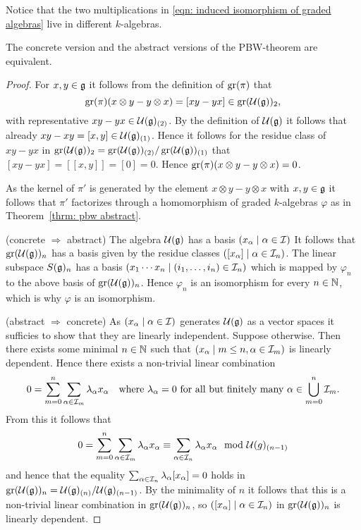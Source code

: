 \begin{rem}
 Notice that the two multiplications in \eqref{eqn: induced isomorphism of graded algebras} live in different $k$-algebras.
\end{rem}


\begin{prop}
 The concrete version and the abstract versions of the PBW-theorem are equivalent.
\end{prop}
\begin{proof}
 For $x, y \in \mathfrak{g}$ it follows from the definition of $\operatorname{gr}(\pi)$ that
 \[
  \operatorname{gr}(\pi)(x \otimes y - y \otimes x) = [xy-yx] \in \operatorname{gr}(\mathcal{U}(\mathfrak{g}))_2,
 \]
 with representative $xy-yx \in \mathcal{U}(\mathfrak{g})_{(2)}$. By the definition of $\mathcal{U}(\mathfrak{g})$ it follows that already \mbox{$xy-xy = [x,y] \in \mathcal{U}(\mathfrak{g})_{(1)}$}. Hence it follows for the residue class of $xy-yx$ in $\operatorname{gr}(\mathcal{U}(\mathfrak{g}))_2 = \operatorname{gr}(\mathcal{U}(\mathfrak{g}))_{(2)}/\operatorname{gr}(\mathcal{U}(\mathfrak{g}))_{(1)}$ that $[xy-yx] = [[x,y]] = [0] = 0$. Hence $\operatorname{gr}(\pi)(x \otimes y - y \otimes x) = 0$.
 
 As the kernel of $\pi'$ is generated by the element $x \otimes y - y \otimes x$ with $x,y \in \mathfrak{g}$ it follows that $\pi'$ factorizes through a homomorphism of graded $k$-algebras $\varphi$ as in Theorem~\ref{thrm: pbw abstract}.
 
 (concrete $\Rightarrow$ abstract) The algebra $\mathcal{U}(\mathfrak{g})$ has a basis $(x_\alpha \mid \alpha \in \mathcal{I})$ It follows that $\operatorname{gr}(\mathcal{U}(\mathfrak{g}))_n$ has a basis given by the residue classes $([x_\alpha] \mid \alpha \in \mathcal{I}_n)$. The linear subspace $S(\mathfrak{g})_n$ has a basis $(x_1 \dotsm x_n \mid (i_1, \dotsc, i_n) \in \mathcal{I}_n)$ which is mapped by $\varphi_n$ to the above basis of $\operatorname{gr}(\mathcal{U}(\mathfrak{g}))_n$. Hence $\varphi_n$ is an isomorphism for every $n \in \mathbb{N}$, which is why $\varphi$ is an isomorphism.
 
 (abstract $\Rightarrow$ concrete) As $(x_\alpha \mid \alpha \in \mathcal{I})$ generates $\mathcal{U}(\mathfrak{g})$ as a vector spaces it sufficies to show that they are linearly independent. Suppose otherwise. Then there exists some minimal $n \in \mathbb{N}$ such that $(x_\alpha \mid m \leq n, \alpha \in \mathcal{I}_m)$ is linearly dependent. Hence there exists a non-trivial linear combination
 \[
  0 = \sum_{m=0}^n \sum_{\alpha \in \mathcal{I}_m} \lambda_\alpha x_\alpha
 \quad
 \text{where $\lambda_\alpha = 0$ for all but finitely many $\alpha \in \bigcup_{m=0}^n \mathcal{I}_m$}.
 \]
 From this it follows that
 \[
  0
  = \sum_{m=0}^n \sum_{\alpha \in \mathcal{I}_m} \lambda_\alpha x_\alpha
  \equiv \sum_{\alpha \in \mathcal{I}_n} \lambda_\alpha x_\alpha
  \mod {\mathcal{U}}(g)_{(n-1)}
 \]
 and hence that the equality $\sum_{\alpha \in \mathcal{I}_n} \lambda_\alpha [x_\alpha] = 0$ holds in $\operatorname{gr}(\mathcal{U}(\mathfrak{g}))_n = \mathcal{U}(\mathfrak{g})_{(n)}/\mathcal{U}(\mathfrak{g})_{(n-1)}$. By the minimality of $n$ it follows that this is a non-trivial linear combination in $\operatorname{gr}(\mathcal{U}(\mathfrak{g}))_n$, so $([x_\alpha] \mid \alpha \in \mathcal{I}_n)$ in $\operatorname{gr}(\mathcal{U}(\mathfrak{g}))_n$ is linearly dependent.
 

\end{proof}
